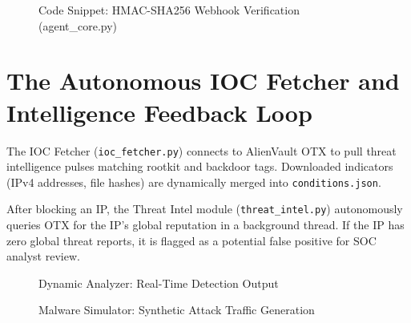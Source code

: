 \begin{figure}[h]
\centering
{}
\caption{Code Snippet: HMAC-SHA256 Webhook Verification (agent\_core.py)}
\label{fig:code_hmac}
\end{figure}

\section{The Autonomous IOC Fetcher and Intelligence Feedback Loop}

The IOC Fetcher (\texttt{ioc\_fetcher.py}) connects to AlienVault OTX to pull threat intelligence pulses matching rootkit and backdoor tags. Downloaded indicators (IPv4 addresses, file hashes) are dynamically merged into \texttt{conditions.json}.

After blocking an IP, the Threat Intel module (\texttt{threat\_intel.py}) autonomously queries OTX for the IP's global reputation in a background thread. If the IP has zero global threat reports, it is flagged as a potential false positive for SOC analyst review.

\begin{figure}[h]
\centering
{}
\caption{Dynamic Analyzer: Real-Time Detection Output}
\label{fig:dynamic_analyzer_output}
\end{figure}

\begin{figure}[h]
\centering
{}
\caption{Malware Simulator: Synthetic Attack Traffic Generation}
\label{fig:malware_simulator}
\end{figure}

